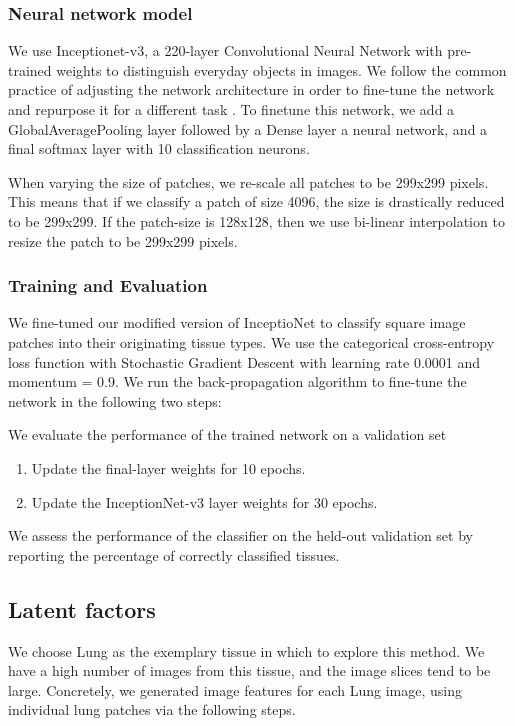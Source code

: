 \documentclass{article}
\begin{document}
\subsubsection{Neural network model}
We use Inceptionet-v3, a 220-layer Convolutional Neural Network with pre-trained weights to distinguish everyday objects in images. We follow the common practice of adjusting the network architecture in order to fine-tune the network and repurpose it for a different task \cite{fine-tuning-deep-convolutional-neural-networks}. To finetune this network, we add a GlobalAveragePooling layer \cite{network-in-network} followed by a Dense layer a neural network, and a final softmax layer with 10 classification neurons.

When varying the size of patches, we re-scale all patches to be 299x299 pixels. This means that if we classify a patch of size 4096, the size is drastically reduced to be 299x299. If the patch-size is 128x128, then we use bi-linear interpolation to resize the patch to be 299x299 pixels. 

\subsubsection{Training and Evaluation}
We fine-tuned our modified version of InceptioNet to classify square image patches into their originating tissue types. We use the categorical cross-entropy loss function with Stochastic Gradient Descent with learning rate 0.0001 and momentum = 0.9. We run the back-propagation algorithm to fine-tune the network in the following two steps:

We evaluate the performance of the trained network on a validation set
\begin{enumerate}
 \item Update the final-layer weights for 10 epochs.
 \item Update the InceptionNet-v3 layer weights for 30 epochs.
\end{enumerate}

We assess the performance of the classifier on the held-out validation set by reporting the percentage of correctly classified tissues.

\subsection{Latent factors}

We choose Lung as the exemplary tissue in which to explore this method. We have a high number of images from this tissue, and the image slices tend to be large. Concretely, we generated image features for each Lung image, using individual lung patches via the following steps.
\end{document}
